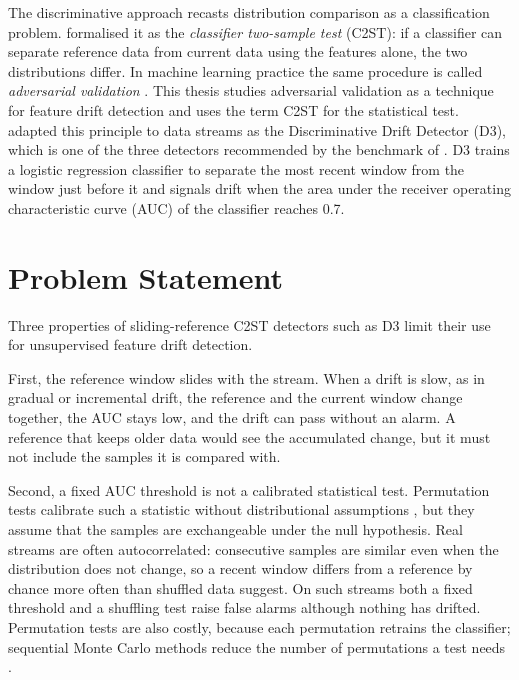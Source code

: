 The discriminative approach recasts distribution comparison as a classification problem. \citet{LopezPazOquab2017} formalised it as the \textit{classifier two-sample test} (C2ST): if a classifier can separate reference data from current data using the features alone, the two distributions differ. In machine learning practice the same procedure is called \textit{adversarial validation} \citep{Pan2020}. This thesis studies adversarial validation as a technique for feature drift detection and uses the term C2ST for the statistical test. \citet{Gozuacik2019} adapted this principle to data streams as the Discriminative Drift Detector (D3), which is one of the three detectors recommended by the benchmark of \citet{Lukats2024}. D3 trains a logistic regression classifier to separate the most recent window from the window just before it and signals drift when the area under the receiver operating characteristic curve (AUC) of the classifier reaches 0.7.

\section{Problem Statement}
Three properties of sliding-reference C2ST detectors such as D3 limit their use for unsupervised feature drift detection.

First, the reference window slides with the stream. When a drift is slow, as in gradual or incremental drift, the reference and the current window change together, the AUC stays low, and the drift can pass without an alarm. A reference that keeps older data would see the accumulated change, but it must not include the samples it is compared with.

Second, a fixed AUC threshold is not a calibrated statistical test. Permutation tests calibrate such a statistic without distributional assumptions \citep{Good2005}, but they assume that the samples are exchangeable under the null hypothesis. Real streams are often autocorrelated: consecutive samples are similar even when the distribution does not change, so a recent window differs from a reference by chance more often than shuffled data suggest. On such streams both a fixed threshold and a shuffling test raise false alarms although nothing has drifted. Permutation tests are also costly, because each permutation retrains the classifier; sequential Monte Carlo methods reduce the number of permutations a test needs \citep{Gandy2009}.

